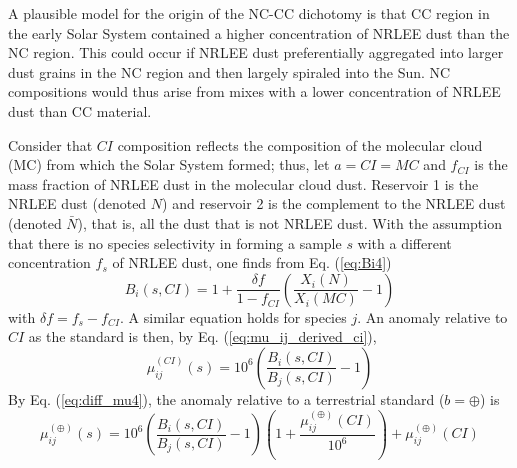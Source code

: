 \documentclass[preprint]{revtex4-2}
\begin{document}
A plausible model for the origin of the NC-CC dichotomy is that CC
region in the early Solar System  contained a higher concentration of NRLEE
dust than the NC region.  This could occur if NRLEE dust preferentially
aggregated into larger dust grains in the NC region and then largely
spiraled into the Sun.  NC compositions would thus arise from mixes
with a lower concentration of NRLEE dust than CC material.

Consider that $CI$ composition reflects the composition of the molecular
cloud (MC) from which the Solar System formed; thus, let $a = CI = MC$ and
$f_{CI}$ is the mass fraction of NRLEE dust in the molecular cloud dust.
Reservoir 1 is the NRLEE dust (denoted $N$) and reservoir 2 is the
complement to the NRLEE dust (denoted $\bar{N}$),
that is, all the dust that is not NRLEE dust.
With the assumption that there is no species selectivity in forming a
sample $s$ with a different concentration $f_s$ of NRLEE dust, one finds
from Eq. (\ref{eq:Bi4})
\begin{equation}
B_i(s, CI) = 1 + \frac{\delta f}{1 - f_{CI}}
\left(\frac{X_i(N)}{X_i(MC)} - 1\right)
\label{eq:BiCI}
\end{equation}
with $\delta f = f_s - f_{CI}$.  A similar equation holds for species $j$.
An anomaly relative to $CI$ as the standard is then,
by Eq. (\ref{eq:mu_ij_derived_ci}),
\begin{equation}
\mu_{ij}^{(CI)}(s) = 10^6 \left(\frac{B_i(s, CI)}{B_j(s, CI)} - 1\right)
\label{eq:mu_ij_derived_ci}
\end{equation}
By Eq. (\ref{eq:diff_mu4}),
the anomaly relative to a terrestrial standard ($b = \oplus$) is 
\begin{equation}
\mu_{ij}^{(\oplus)}(s) = 10^6 \left(\frac{B_i(s, CI)}{B_j(s, CI)} - 1\right)
\left(1 + \frac{\mu_{ij}^{(\oplus)}(CI)}{10^6}\right)
+ \mu_{ij}^{(\oplus)}(CI)
\label{eq:mu_ij_derived_earth}
\end{equation}
\end{document}

